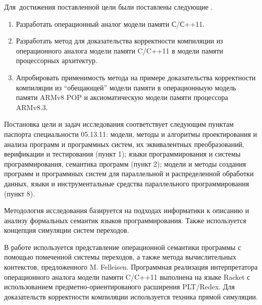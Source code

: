 Для~достижения поставленной цели были поставлены следующие {\tasks}.
\begin{enumerate}
  \item Разработать операционный аналог модели памяти С/С++11.
  \item Разработать метод для доказательства корректности компиляции из операционного аналога модели памяти C/C++11 в модели памяти
        процессорных архитектур.
  \item Апробировать применимость метода на примере доказательства корректности компиляции из ``обещающей'' модели памяти в
        операционныую модель памяти ARMv8 POP и аксиоматическую модели памяти процессора ARMv8.3.
\end{enumerate}

Постановка цели и задач исследования соответствует следующим пунктам паспорта специальности 05.13.11:
модели, методы и алгоритмы проектирования и анализа программ и программных систем, их эквивалентных преобразований, верификации и тестирования (пункт 1);
языки программирования и системы программирования, семантика программ (пункт 2);
модели и методы создания программ и программных систем для параллельной и распределенной обработки данных,
языки и инструментальные средства параллельного программирования (пункт 8).

{\methods}
Методология исследования базируется на подходах информатики
к описанию и анализу формальных семантик языков программирования.
Также используется концепция симуляции систем переходов.

В работе используется представление операционной семантики программы с помощью помеченной системы переходов, а также
метода вычислительных контекстов, предложенного M. Felleisen.
Программная реализация интерпретатора операционного аналога модели памяти C/C++11 выполнена на языке Racket с использованием
предметно-ориентированого расширения PLT/Redex.
Для доказательств корректности компиляции используется техника прямой симуляции.

